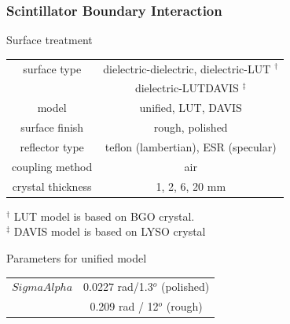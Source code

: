 \documentclass[xcolor=x11names, compress, handout]{beamer}
\renewcommand{\(}{\begin{columns}}
\renewcommand{\)}{\end{columns}}
\newcommand{\<}[1]{\begin{column}{#1}}
\renewcommand{\>}{\end{column}}
\begin{document}
\begin{frame}
\frametitle{Scintillator Boundary Interaction}
\scriptsize

\begin{block}{Surface treatment}
\centering
\begin{tabular}{c | c }
 surface type & dielectric-dielectric, dielectric-LUT $^\dagger$ \\
 &  dielectric-LUTDAVIS $^\ddagger$\\
 model &  unified, LUT, DAVIS   \\
 surface finish & rough, polished \\
 reflector type & teflon (lambertian), ESR (specular) \\
 coupling method & air \\
 crystal thickness & 1, 2, 6, 20 mm \\
\end{tabular}
\end{block}

$^\dagger$ LUT model is based on BGO crystal. \cite{janecek_moses_2008} \\
$^\ddagger$ DAVIS model is based on LYSO crystal \cite{roncali_cherry_2013} \\

\begin{block}{Parameters for unified model}
\centering
\begin{tabular}{c | c}
$SigmaAlpha$  & 0.0227 rad/1.3$^o$ (polished) \\
& 0.209 rad / 12$^o$ (rough) \\
\end{tabular}
\end{block}
\end{frame}
\end{document}
